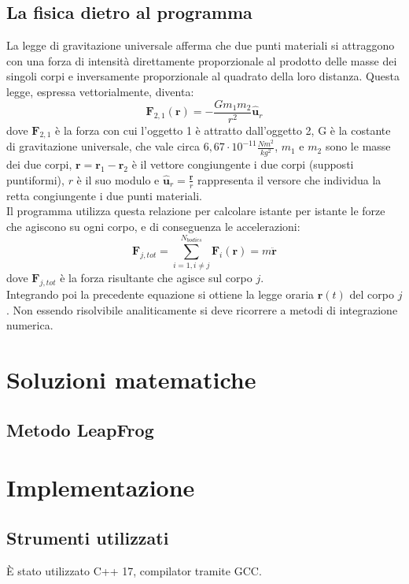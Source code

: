 \documentclass{article}
\begin{document}
\subsection{La fisica dietro al programma}
La legge di gravitazione universale afferma che due punti materiali si attraggono con una forza di intensità direttamente proporzionale al prodotto delle masse dei singoli corpi e inversamente proporzionale al quadrato della loro distanza. Questa legge, espressa vettorialmente, diventa:
\begin{equation}
    \textbf{F}_{2,1}(\textbf{r})=-\frac{Gm_{1}m_{2}}{r^{2}}\hat{\textbf{u}}_{r}
\end{equation}
dove $\textbf{F}_{2,1}$ è la forza con cui l'oggetto 1 è attratto dall'oggetto 2, G è la costante di gravitazione universale, che vale circa $6,67\cdot 10^{-11}\frac{Nm^2}{kg^2}$, $m_1$ e $m_2$ sono le masse dei due corpi, $\textbf{r}=\textbf{r}_1-\textbf{r}_2$ è il vettore congiungente i due corpi (supposti puntiformi),
$r$ è il suo modulo e $\hat{\textbf{u}}_{r}=\frac{\textbf{r}}{r}$ rappresenta il versore che individua la retta congiungente i due punti materiali.\\
Il programma utilizza questa relazione per calcolare istante per istante le forze che agiscono su ogni corpo, e di conseguenza le accelerazioni:
\begin{equation}
    \textbf{F}_{j,tot}=\sum_{i=1, i\neq j}^{N_{bodies}}\textbf{F}_{i}(\textbf{r})=m\ddot{\textbf{r}}
\end{equation}
dove $\textbf{F}_{j,tot}$ è la forza risultante che agisce sul corpo $j$.\\
Integrando poi la precedente equazione si ottiene la legge oraria $\textbf{r}(t)$ del corpo $j$. Non essendo risolvibile analiticamente si deve ricorrere a metodi di integrazione numerica.

\section{Soluzioni matematiche}
\subsection{Metodo LeapFrog}

\section{Implementazione}
\subsection{Strumenti utilizzati}
È stato utilizzato C++ 17, compilator tramite GCC.
\end{document}
